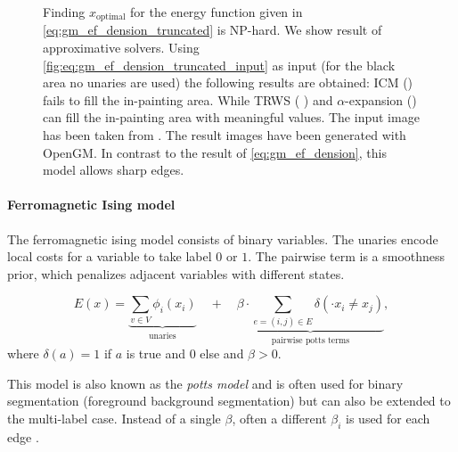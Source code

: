 \begin{figure}[H]
{    }
    \caption[Energy based truncated denoising]{
        Finding $x_{\text{optimal}} $ for the energy function given
        in \cref{eq:gm_ef_dension_truncated} is NP-hard. We show result of approximative solvers.
        Using \cref{fig:eq:gm_ef_dension_truncated_input} as input (for the black area no unaries 
        are used)
        the following
        results are obtained: ICM \citep{besag_1986_icm}  () fails
        to fill the in-painting area. While TRWS \cite{kolmogorov_2006_pami_trws}  ( ) 
        and $\alpha$-expansion \cite{boykov_2001_pami} () can fill the in-painting area
        with meaningful values.
        The input image has been taken from \citep{szeliski_2008_pami}.
        The result images have been generated with OpenGM\citep{andres_2012_opengm_arxiv}.
        In contrast to the result of \cref{eq:gm_ef_dension}, this model
        allows sharp edges.
    }\label{fig:gm_ef_dension_truncated}
\end{figure}


\paragraph{Ferromagnetic Ising model}
The ferromagnetic ising model consists 
of binary variables.
The unaries encode local costs for a variable
to take label $0$ or $1$.
The pairwise term is a smoothness prior, which penalizes
adjacent variables with different states.

\begin{equation} \label{eq:gm_ising}
    E(x) = 
    \underbrace{
        \sum_{v \in V} \phi_i(x_i)
    }_{\text{unaries}}
     \quad +  \quad
    \underbrace{
        \beta \cdot \sum_{e=(i,j) \in E }  \delta(\cdot x_i\neq x_j) 
    }_{\text{pairwise potts terms}} ,
\end{equation}
where $\delta(a)=1$ if $a$ is true and $0$ else
and $\beta>0$.

This model is also known as the \emph{potts model} and is often
used for binary segmentation (\eg\quad foreground background segmentation)
but can also be extended to the multi-label case.
Instead of a single $\beta$, often a different $\beta_i$ is used
for each edge \citep{szeliski_2008_pami}.



